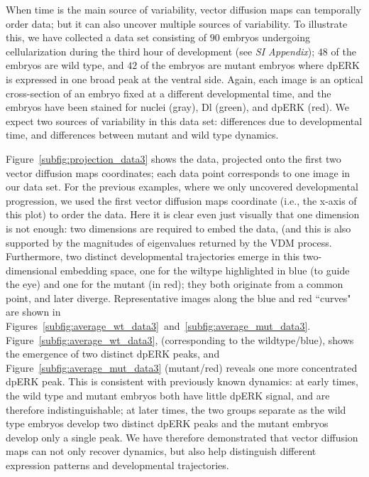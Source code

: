 \documentclass{pnastwo}
\begin{document}
\begin{article}
When time is the main source of variability,
vector diffusion maps can temporally order data; but it can also uncover multiple sources of variability.
%
%
%
To illustrate this, we have collected a data set consisting of $90$ embryos undergoing cellularization during the third hour of development (see {\it SI Appendix}); $48$ of the embryos are wild type, and $42$ of the embryos are mutant embryos where dpERK is expressed in one broad peak at the ventral side.
%
Again, each image is an optical cross-section of an embryo fixed at a different developmental time, and the embryos have been stained for nuclei (gray), Dl (green), and dpERK (red).
%
We expect two sources of variability in this data set: differences due to developmental time, and differences between mutant and wild type dynamics.

Figure~\ref{subfig:projection_data3} shows the data, projected onto the first two vector diffusion maps coordinates;
each data point corresponds to one image in our data set.
%
For the previous examples, where we only uncovered developmental progression, we used the first vector diffusion maps coordinate (i.e., the x-axis of this plot) to order the data.
%
Here it is clear even just visually that one dimension is not enough: two dimensions are required to embed the data,
(and this is also supported by the magnitudes of eigenvalues returned by the VDM process.
%
Furthermore, two distinct developmental trajectories emerge in this two-dimensional embedding space, 
one for the wiltype highlighted in blue  (to guide the eye) and one for the mutant (in red); 
they both originate from a common point, and later diverge.
%
Representative images along the blue and red ``curves" are shown in Figures~\ref{subfig:average_wt_data3}~and~\ref{subfig:average_mut_data3}.
%
Figure~\ref{subfig:average_wt_data3}, (corresponding to the wildtype/blue), shows the emergence of two distinct dpERK peaks, and Figure~\ref{subfig:average_mut_data3} (mutant/red) reveals one more concentrated dpERK peak.
%
This is consistent with previously known dynamics:
at early times, the wild type and mutant embryos both have little dpERK signal, and are therefore indistinguishable;
at later times, the two groups separate as the wild type embryos develop two distinct dpERK peaks and the mutant embryos develop only a single peak.
%
We have therefore demonstrated that vector diffusion maps can not only recover dynamics, but also help distinguish different expression patterns and developmental trajectories.


\end{article}
\end{document}
